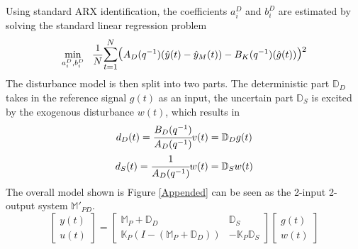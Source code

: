 \documentclass[letterpaper, 10 pt, conference]{ieeeconf}  %
\begin{document}
Using standard ARX identification, the coefficients $a_i^D$ and $b_i^D$ are estimated by solving the standard linear regression problem
	\begin{equation}
	\small
	\begin{aligned}
	 \underset{a_i^D,b_i^D}{\text{min}}
	& \hspace{8pt} \frac{1}{N}\mathlarger{\sum\limits_{t=1}^N}\mathlarger{\mathlarger{(}}A_D(q^{-1})(\hat{y}(t)-\hat{y}_M(t))-B_K(q^{-1})(\hat{g}(t))\mathlarger{\mathlarger{)}}^2 \\
	\end{aligned}
	\label{DSensor}
	\end{equation}
	\normalsize
The disturbance model is then split into two parts. The deterministic part $\mathbb{D}_D$ takes in the reference signal $g(t)$ as an input, the uncertain part $\mathbb{D}_S$ is excited by the exogenous disturbance $w(t)$, which results in
	\begin{equation*}
	\begin{matrix}
	d_D(t) = \cfrac{B_D(q^{-1})}{A_D(q^{-1})}v(t) = \mathbb{D}_D g(t) \vspace{4pt} \\  
	d_S(t) = \cfrac{1}{A_D(q^{-1})}w(t) = \mathbb{D}_S w(t)
	\end{matrix}
	\end{equation*}
	The overall model shown is Figure \ref{Appended} can be seen as the 2-input 2-output system $\mathbb{M}'_{PD}$.
	\begin{equation}
	\begin{bmatrix}
	y(t) \\ u(t)
	\end{bmatrix} = 
	\begin{bmatrix} 
	\mathbb{M}_P+\mathbb{D}_D & \mathbb{D}_S \\
	\mathbb{K}_P(I-(\mathbb{M}_P+\mathbb{D}_D)) &  -\mathbb{K}_P\mathbb{D}_S
	\end{bmatrix}
	\begin{bmatrix}
	g(t) \\ w(t)
	\end{bmatrix}
	\label{TF_w}
	\end{equation}
\end{document}
